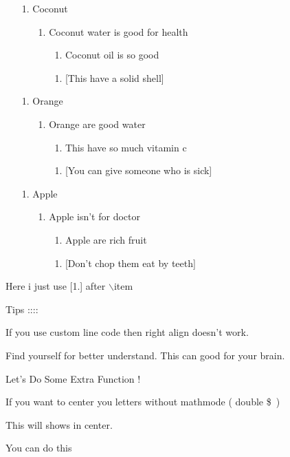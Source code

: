 \documentclass[11pt]{article}
\begin{document}
\begin{enumerate}
\item [1.] Coconut
\begin{itemize}
\item [1.] Coconut water is good for health
\begin{enumerate}[A.]
\item [1.] Coconut oil is so good
\item [1.] [This have a solid shell]
\end{enumerate}
\end{itemize}
\item [1.] Orange
\begin{itemize}
\item [1.] Orange are good water
\begin{enumerate}[A.]
\item [1.] This have so much vitamin c
\item [1.] [You can give someone who is sick]
\end{enumerate}
\end{itemize}
\item [1.] Apple
\begin{itemize}
\item [1.] Apple isn't for doctor
\begin{enumerate}[A.]
\item [1.] Apple are rich fruit
\item [1.] [Don't chop them eat by teeth]
\end{enumerate}
\end{itemize}
\end{enumerate}


Here i just use [1.] after $\backslash$item

\vspace{1cm}

Tips ::::

If you use custom line code then right align doesn't work.

Find yourself for better understand. This can good for your brain.

\pagebreak

Let's Do Some Extra Function !

If you want to center you letters without mathmode ( double \$\ )

\begin{center}This will shows in center.\end{center} 

You can do this 
\end{document}
